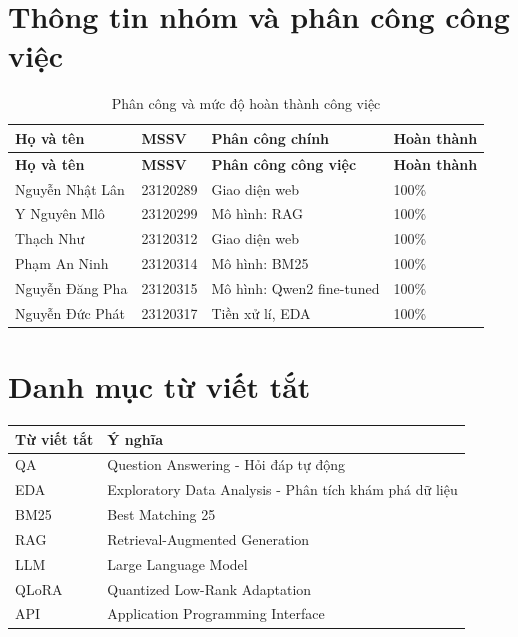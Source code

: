 \documentclass[12pt,a4paper,oneside]{report}
\begin{document}
\chapter*{Thông tin nhóm và phân công công việc}
\begin{longtable}{p{3.2cm}p{2.5cm}p{7.2cm}p{1.7cm}}
\caption{Phân công và mức độ hoàn thành công việc}\label{tab:contribution}\\
\toprule
\textbf{Họ và tên} & \textbf{MSSV} & \textbf{Phân công chính} & \textbf{Hoàn thành}\\
\midrule
\endfirsthead
\toprule
\textbf{Họ và tên} & \textbf{MSSV} & \textbf{Phân công công việc} & \textbf{Hoàn thành}\\
\midrule
\endhead
Nguyễn Nhật Lân & 23120289 & Giao diện web & 100\%\\
Y Nguyên Mlô & 23120299 & Mô hình: RAG & 100\%\\
Thạch Như & 23120312 & Giao diện web & 100\%\\
Phạm An Ninh & 23120314 & Mô hình: BM25 & 100\%\\
Nguyễn Đăng Pha & 23120315 & Mô hình:  Qwen2 fine-tuned & 100\%\\
Nguyễn Đức Phát & 23120317 & Tiền xử lí, EDA & 100\%\\
\bottomrule
\end{longtable}

\tableofcontents

\chapter*{Danh mục từ viết tắt}
\begin{tabularx}{\textwidth}{p{3cm}Y}
\toprule
\textbf{Từ viết tắt} & \textbf{Ý nghĩa}\\
\midrule
QA & Question Answering - Hỏi đáp tự động\\
EDA & Exploratory Data Analysis - Phân tích khám phá dữ liệu\\
BM25 & Best Matching 25\\
RAG & Retrieval-Augmented Generation\\
LLM & Large Language Model\\
QLoRA & Quantized Low-Rank Adaptation\\
API & Application Programming Interface\\
\bottomrule
\end{tabularx}
\end{document}
